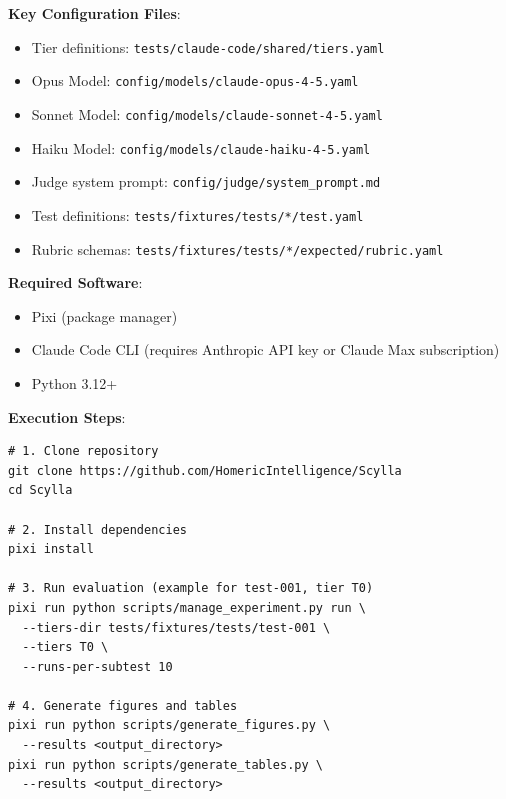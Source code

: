 \documentclass[11pt]{article}
\begin{document}
\textbf{Key Configuration Files}:

\begin{itemize}
\item Tier definitions: \texttt{tests/claude-code/shared/tiers.yaml}
\item Opus Model: \texttt{config/models/claude-opus-4-5.yaml}
\item Sonnet Model: \texttt{config/models/claude-sonnet-4-5.yaml}
\item Haiku Model: \texttt{config/models/claude-haiku-4-5.yaml}
\item Judge system prompt: \texttt{config/judge/system\_prompt.md}
\item Test definitions: \texttt{tests/fixtures/tests/*/test.yaml}
\item Rubric schemas: \texttt{tests/fixtures/tests/*/expected/rubric.yaml}
\end{itemize}

\textbf{Required Software}:

\begin{itemize}
\item Pixi (package manager)
\item Claude Code CLI (requires Anthropic API key or Claude Max subscription)
\item Python 3.12+
\end{itemize}

\textbf{Execution Steps}:

\begin{lstlisting}
# 1. Clone repository
git clone https://github.com/HomericIntelligence/Scylla
cd Scylla

# 2. Install dependencies
pixi install

# 3. Run evaluation (example for test-001, tier T0)
pixi run python scripts/manage_experiment.py run \
  --tiers-dir tests/fixtures/tests/test-001 \
  --tiers T0 \
  --runs-per-subtest 10

# 4. Generate figures and tables
pixi run python scripts/generate_figures.py \
  --results <output_directory>
pixi run python scripts/generate_tables.py \
  --results <output_directory>
\end{lstlisting}
\end{document}
